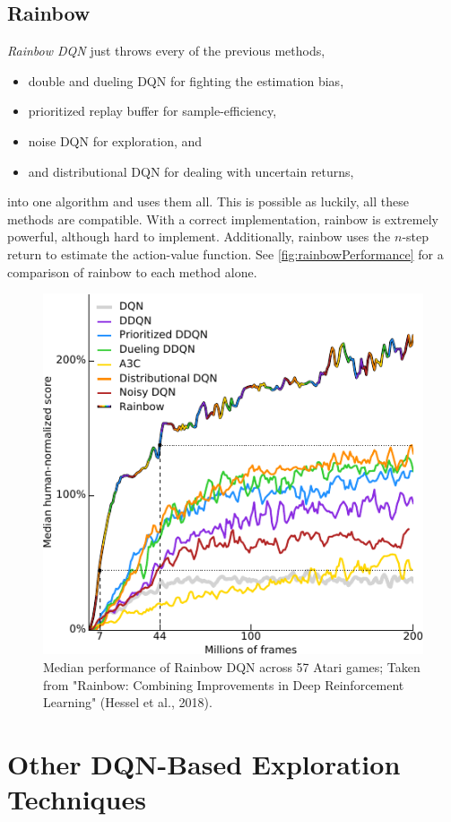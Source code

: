 		\subsection{Rainbow}
			\emph{Rainbow \ac{DQN}} just throws every of the previous methods,
			\begin{itemize}
				\item double and dueling \ac{DQN} for fighting the estimation bias,
				\item prioritized replay buffer for sample-efficiency,
				\item noise \ac{DQN} for exploration, and
				\item and distributional \ac{DQN} for dealing with uncertain returns,
			\end{itemize}
			into one algorithm and uses them all. This is possible as luckily, all these methods are compatible. With a correct implementation, rainbow is extremely powerful, although hard to implement. Additionally, rainbow uses the \(n\)-step return to estimate the action-value function. See \autoref{fig:rainbowPerformance} for a comparison of rainbow to each method alone.

			\begin{figure}
				\centering
				\includegraphics[width=0.5\linewidth]{figures/rainbow-dqn.pdf}
				\caption[Performance of Rainbow \acs{DQN}]{Median performance of Rainbow \acs{DQN} across 57 Atari games; Taken from "Rainbow: Combining Improvements in Deep Reinforcement Learning" (Hessel et al., 2018).}
				\label{fig:rainbowPerformance}
			\end{figure}

	\section{Other \acs{DQN}-Based Exploration Techniques}
		\label{sec:otherApproaches}

